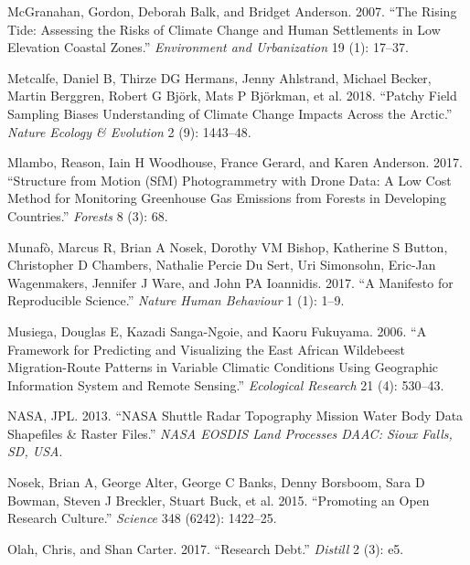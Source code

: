 \documentclass[
  12pt,
]{article}
\newlength{\cslhangindent}
\newlength{\cslentryspacingunit} %
\newenvironment{CSLReferences}[2] %
 {%
  \setlength{\parindent}{0pt}
  \ifodd #1
  \let\oldpar\par
  \def\par{\hangindent=\cslhangindent\oldpar}
  \fi
  \setlength{\parskip}{#2\cslentryspacingunit}
 }%
 {}
\begin{document}
\begin{CSLReferences}{1}{0}
\leavevmode{}%
McGranahan, Gordon, Deborah Balk, and Bridget Anderson. 2007. {``The
Rising Tide: Assessing the Risks of Climate Change and Human Settlements
in Low Elevation Coastal Zones.''} \emph{Environment and Urbanization}
19 (1): 17--37.

\leavevmode{}%
Metcalfe, Daniel B, Thirze DG Hermans, Jenny Ahlstrand, Michael Becker,
Martin Berggren, Robert G Björk, Mats P Björkman, et al. 2018. {``Patchy
Field Sampling Biases Understanding of Climate Change Impacts Across the
Arctic.''} \emph{Nature Ecology \& Evolution} 2 (9): 1443--48.

\leavevmode{}%
Mlambo, Reason, Iain H Woodhouse, France Gerard, and Karen Anderson.
2017. {``Structure from Motion (SfM) Photogrammetry with Drone Data: A
Low Cost Method for Monitoring Greenhouse Gas Emissions from Forests in
Developing Countries.''} \emph{Forests} 8 (3): 68.

\leavevmode{}%
Munafò, Marcus R, Brian A Nosek, Dorothy VM Bishop, Katherine S Button,
Christopher D Chambers, Nathalie Percie Du Sert, Uri Simonsohn, Eric-Jan
Wagenmakers, Jennifer J Ware, and John PA Ioannidis. 2017. {``A
Manifesto for Reproducible Science.''} \emph{Nature Human Behaviour} 1
(1): 1--9.

\leavevmode{}%
Musiega, Douglas E, Kazadi Sanga-Ngoie, and Kaoru Fukuyama. 2006. {``A
Framework for Predicting and Visualizing the East African Wildebeest
Migration-Route Patterns in Variable Climatic Conditions Using
Geographic Information System and Remote Sensing.''} \emph{Ecological
Research} 21 (4): 530--43.

\leavevmode{}%
NASA, JPL. 2013. {``NASA Shuttle Radar Topography Mission Water Body
Data Shapefiles \& Raster Files.''} \emph{NASA EOSDIS Land Processes
DAAC: Sioux Falls, SD, USA}.

\leavevmode{}%
Nosek, Brian A, George Alter, George C Banks, Denny Borsboom, Sara D
Bowman, Steven J Breckler, Stuart Buck, et al. 2015. {``Promoting an
Open Research Culture.''} \emph{Science} 348 (6242): 1422--25.

\leavevmode{}%
Olah, Chris, and Shan Carter. 2017. {``Research Debt.''} \emph{Distill}
2 (3): e5.


\end{CSLReferences}
\end{document}
